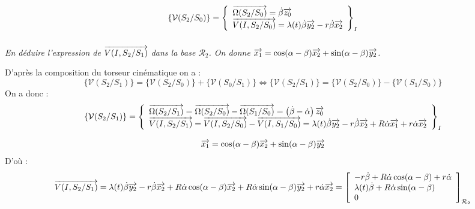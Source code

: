 \documentclass[10pt,fleqn]{article} %
\begin{document}
\begin{multicols}{2}
\begin{corrige}
$$\{\mathcal{V}(S_2/S_0)\} = 
\left\{
\begin{array}{l}
\overrightarrow{\Omega(S_2/S_0)} = \dot{\beta}\overrightarrow{z_0} \\
\overrightarrow{V(I,S_2/S_0)} = \lambda(t) \dot{\beta}\overrightarrow{y_2} - r\dot{\beta}\overrightarrow{x_2}
\end{array}
\right\}_I
$$

\end{corrige}
\else \fi

\subparagraph{}
\textit{En déduire l'expression de $\overrightarrow{V(I,S_2/S_1)}$ dans la base $\mathcal{R}_2$. On donne $ \overrightarrow{x_1} 
=\cos(\alpha-\beta)\overrightarrow{x_2} + \sin(\alpha-\beta)\overrightarrow{y_2}
$.}

\ifprof%
\begin{corrige}
D'après la composition du torseur cinématique on a :
$$
\{ \mathcal{V}(S_2/S_1)\} = \{ \mathcal{V}(S_2/S_0)\} + \{ \mathcal{V}(S_0/S_1)\} 
\Longleftrightarrow \{ \mathcal{V}(S_2/S_1)\} = \{ \mathcal{V}(S_2/S_0)\} - \{ \mathcal{V}(S_1/S_0)\} 
$$
On a donc : 
$$
\{ \mathcal{V}(S_2/S_1)\} =
\left\{
\begin{array}{l}
\overrightarrow{\Omega(S_2/S_1)} = \overrightarrow{\Omega(S_2/S_0)} - \overrightarrow{\Omega(S_1/S_0)}  = \left(\dot{\beta}-\dot{\alpha} \right)\overrightarrow{z_0} \\
\overrightarrow{V(I,S_2/S_1)} = \overrightarrow{V(I,S_2/S_0)} - \overrightarrow{V(I,S_1/S_0)} 
=
 \lambda(t) \dot{\beta}\overrightarrow{y_2} - r\dot{\beta}\overrightarrow{x_2} +
 R\dot{\alpha}\overrightarrow{x_1} + r\dot{\alpha}\overrightarrow{x_2}
\end{array}
\right\}_I
$$


$$ \overrightarrow{x_1} 
=\cos(\alpha-\beta)\overrightarrow{x_2} + \sin(\alpha-\beta)\overrightarrow{y_2}
$$
D'où :
$$
\overrightarrow{V(I,S_2/S_1)} =
 \lambda(t) \dot{\beta}\overrightarrow{y_2} - r\dot{\beta}\overrightarrow{x_2} +
 R\dot{\alpha}\cos(\alpha-\beta)\overrightarrow{x_2} +  R\dot{\alpha}\sin(\alpha-\beta)\overrightarrow{y_2} + r\dot{\alpha}\overrightarrow{x_2}
=\left[
\begin{array}{l}
- r\dot{\beta}+ R\dot{\alpha}\cos(\alpha-\beta) + r\dot{\alpha}\\
 \lambda(t) \dot{\beta}+  R\dot{\alpha}\sin(\alpha-\beta)\\
0\\
\end{array}
\right]_{\mathcal{R}_2}
$$


\end{corrige}
\end{multicols}
\end{document}
